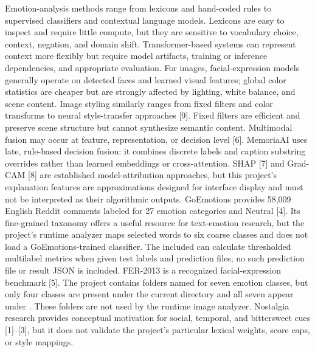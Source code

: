 \documentclass[conference]{IEEEtran}
\begin{document}
{}\markdownRendererSectionBegin
{}\markdownRendererInterblockSeparator
{}Emotion-analysis methods range from lexicons and hand-coded rules to supervised classifiers and contextual language models. Lexicons are easy to inspect and require little compute, but they are sensitive to vocabulary choice, context, negation, and domain shift. Transformer-based systems can represent context more flexibly but require model artifacts, training or inference dependencies, and appropriate evaluation. For images, facial-expression models generally operate on detected faces and learned visual features; global color statistics are cheaper but are strongly affected by lighting, white balance, and scene content.\markdownRendererParagraphSeparator
{}Image styling similarly ranges from fixed filters and color transforms to neural style-transfer approaches [9]. Fixed filters are efficient and preserve scene structure but cannot synthesize semantic content. Multimodal fusion may occur at feature, representation, or decision level [6]. MemoriaAI uses late, rule-based decision fusion: it combines discrete labels and caption substring overrides rather than learned embeddings or cross-attention. SHAP [7] and Grad-CAM [8] are established model-attribution approaches, but this project’s explanation features are approximations designed for interface display and must not be interpreted as their algorithmic outputs.\markdownRendererInterblockSeparator
{}
\markdownRendererSectionEnd \markdownRendererSectionBegin
{}\markdownRendererInterblockSeparator
{}GoEmotions provides 58,009 English Reddit comments labeled for 27 emotion categories and Neutral [4]. Its fine-grained taxonomy offers a useful resource for text-emotion research, but the project’s runtime analyzer maps selected words to six coarse classes and does not load a GoEmotions-trained classifier. The included  can calculate thresholded multilabel metrics when given test labels and prediction files; no such prediction file or result JSON is included.\markdownRendererParagraphSeparator
{}FER-2013 is a recognized facial-expression benchmark [5]. The project contains folders named for seven emotion classes, but only four classes are present under the current  directory and all seven appear under . These folders are not used by the runtime image analyzer. Nostalgia research provides conceptual motivation for social, temporal, and bittersweet cues [1]–[3], but it does not validate the project’s particular lexical weights, score caps, or style mappings.\markdownRendererInterblockSeparator
\end{document}
